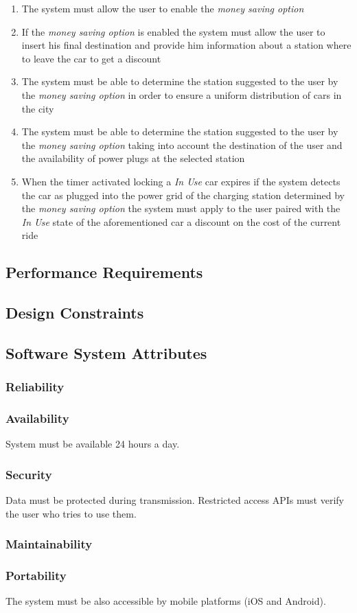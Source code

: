 \begin{description}
  			\begin{enumerate}[resume*]
  				\item The system must allow the user to enable the \emph{money saving option}
  				\item If the  \emph{money saving option} is enabled the system must allow the user
  				to insert his final destination and provide him information about a station where to
  				leave the car to get a discount
  				\item The system must be able to determine the station suggested to the user by the
  				\emph{money saving option} in order to ensure a uniform distribution of cars in the
  				city
  				\item The system must be able to determine the station suggested to the user by the
  				\emph{money saving option} taking into account the destination of the user and
  				the availability of power plugs at the selected station
  				\item When the timer activated locking a \emph{In Use} car expires if the system
  				detects the car as plugged into the power grid of the charging station determined by
  				the \emph{money saving option} the system must apply to the user paired with the
  				\emph{In Use} state of the aforementioned car a discount on the cost of
  				the current ride		
   			\end{enumerate}
  	\end{description}
  	
\subsection{Performance Requirements}
\subsection{Design Constraints}
\subsection{Software System Attributes}
	\subsubsection{Reliability}
	\subsubsection{Availability}
	System must be available 24 hours a day.
	\subsubsection{Security}
	Data must be protected during transmission.
	Restricted access APIs must verify the user who tries to use them.
	\subsubsection{Maintainability}
	\subsubsection{Portability}
	The system must be also accessible by mobile platforms (iOS and Android).

